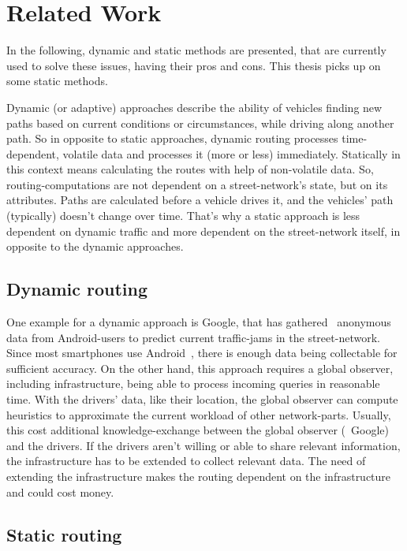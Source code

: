 \section{Related Work}

    In the following, dynamic and static methods are presented, that are currently used to solve these issues, having their pros and cons.
    This thesis picks up on some static methods.

    Dynamic (or adaptive) approaches describe the ability of vehicles finding new paths based on current conditions or circumstances, while driving along another path.
    So in opposite to static approaches, dynamic routing processes time-dependent, volatile data and processes it (more or less) immediately.
    Statically in this context means calculating the routes with help of non-volatile data.
    So, routing-computations are not dependent on a street-network's state, but on its attributes.
    Paths are calculated before a vehicle drives it, and the vehicles' path (typically) doesn't change over time.
    That's why a static approach is less dependent on dynamic traffic and more dependent on the street-network itself, in opposite to the dynamic approaches.

    \subsection{Dynamic routing}

        One example for a dynamic approach is Google, that has gathered~\cite{barth:google-traffic} anonymous data from Android-users to predict current traffic-jams in the street-network.
        Since most smartphones use Android~\cite{kantar:android-vs-ios}, there is enough data being collectable for sufficient accuracy.
        On the other hand, this approach requires a global observer, including infrastructure, being able to process incoming queries in reasonable time.
        With the drivers' data, like their location, the global observer can compute heuristics to approximate the current workload of other network-parts.
        Usually, this cost additional knowledge-exchange between the global observer (\eg\ Google) and the drivers.
        If the drivers aren't willing or able to share relevant information, the infrastructure has to be extended to collect relevant data.
        The need of extending the infrastructure makes the routing dependent on the infrastructure and could cost money.

    \subsection{Static routing}

